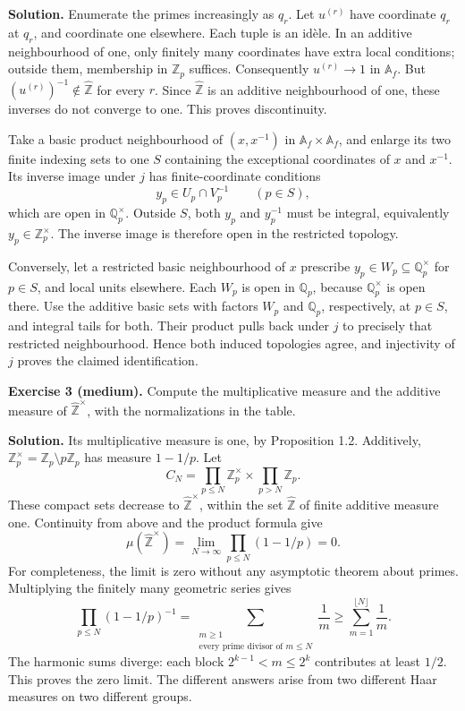\documentclass[
  english,
  11pt,
  a4paper,
]{article}
\begin{document}
\textbf{Solution.} Enumerate the primes increasingly as \(q_r\). Let
\(u^{(r)}\) have coordinate \(q_r\) at \(q_r\), and coordinate one
elsewhere. Each tuple is an idèle. In an additive neighbourhood of one,
only finitely many coordinates have extra local conditions; outside
them, membership in \(\mathbb Z_p\) suffices. Consequently
\(u^{(r)}\to1\) in \(\mathbb A_f\). But
\((u^{(r)})^{-1}\notin\widehat{\mathbb Z}\) for every \(r\). Since
\(\widehat{\mathbb Z}\) is an additive neighbourhood of one, these
inverses do not converge to one. This proves discontinuity.

Take a basic product neighbourhood of \((x,x^{-1})\) in
\(\mathbb A_f\times\mathbb A_f\), and enlarge its two finite indexing
sets to one \(S\) containing the exceptional coordinates of \(x\) and
\(x^{-1}\). Its inverse image under \(j\) has finite-coordinate
conditions \[y_p\in U_p\cap V_p^{-1}\qquad(p\in S),\] which are open in
\(\mathbb Q_p^\times\). Outside \(S\), both \(y_p\) and \(y_p^{-1}\)
must be integral, equivalently \(y_p\in\mathbb Z_p^\times\). The inverse
image is therefore open in the restricted topology.

Conversely, let a restricted basic neighbourhood of \(x\) prescribe
\(y_p\in W_p\subseteq\mathbb Q_p^\times\) for \(p\in S\), and local
units elsewhere. Each \(W_p\) is open in \(\mathbb Q_p\), because
\(\mathbb Q_p^\times\) is open there. Use the additive basic sets with
factors \(W_p\) and \(\mathbb Q_p\), respectively, at \(p\in S\), and
integral tails for both. Their product pulls back under \(j\) to
precisely that restricted neighbourhood. Hence both induced topologies
agree, and injectivity of \(j\) proves the claimed identification.

\textbf{Exercise 3 (medium).} Compute the multiplicative measure and the
additive measure of \(\widehat{\mathbb Z}^\times\), with the
normalizations in the table.

\textbf{Solution.} Its multiplicative measure is one, by Proposition
1.2. Additively,
\(\mathbb Z_p^\times=\mathbb Z_p\setminus p\mathbb Z_p\) has measure
\(1-1/p\). Let \[C_N=\prod_{p\leq N}\mathbb Z_p^\times
\times\prod_{p>N}\mathbb Z_p.\] These compact sets decrease to
\(\widehat{\mathbb Z}^\times\), within the set \(\widehat{\mathbb Z}\)
of finite additive measure one. Continuity from above and the product
formula give \[\mu(\widehat{\mathbb Z}^\times)
=\lim_{N\to\infty}\prod_{p\leq N}(1-1/p)=0.\] For completeness, the
limit is zero without any asymptotic theorem about primes. Multiplying
the finitely many geometric series gives \[\prod_{p\leq N}(1-1/p)^{-1}
=\sum_{\substack{m\geq1\\\text{every prime divisor of }m\leq N}}\frac1m
\geq\sum_{m=1}^{\lfloor N\rfloor}\frac1m.\] The harmonic sums diverge:
each block \(2^{k-1}<m\leq2^k\) contributes at least \(1/2\). This
proves the zero limit. The different answers arise from two different
Haar measures on two different groups.
\end{document}
